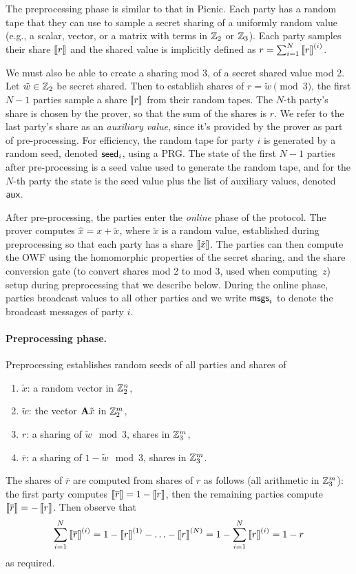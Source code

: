 The preprocessing phase is similar to that in Picnic.  Each party has a random
tape that they can use to sample a secret sharing of a uniformly random value
(e.g.,  a scalar, vector, or a matrix with terms in $\mathbb{Z}_2$ or $\mathbb{Z}_3$).  Each
party samples their share $\left\llbracket r \right\rrbracket$ and the shared value is implicitly defined as
$r = \sum_{i=1}^N \left\llbracket r \right\rrbracket^{(i)}$.  

We must also be able to create a sharing mod 3, of a secret shared value mod 2.
Let $\tilde{w}\in\mathbb{Z}_2$ be secret shared.  Then to establish shares of $r = \tilde{w} \pmod
3$, the first $N-1$ parties sample a share $\left\llbracket r \right\rrbracket$ from their random tapes. The
$N$-th party's share is chosen by the prover, so that the sum of the shares is
$r$.  We refer to the last party's share as an \emph{auxiliary value}, since
it's provided by the prover as part of pre-processing.  For efficiency, the random
tape for  party $i$ is
generated by a random seed, denoted $\textsf{seed}_i$, using a PRG. The state of the first
$N-1$ parties after pre-processing is a seed value used to generate the random
tape, and for the $N$-th party the state is the seed value plus the list of
auxiliary values, denoted $\textsf{aux}$. 

After pre-processing, the parties enter the \emph{online} phase of the protocol. 
The prover computes $\hat{x}= x + \tilde{x}$, where $\tilde{x}$ is a random value, established during
preprocessing so that each party has a share $\left\llbracket \tilde{x} \right\rrbracket$. 
The parties can then compute the OWF using the homomorphic properties of the secret sharing, 
and the share conversion gate (to convert shares mod 2 to mod 3, used when computing~$z$)
setup during preprocessing that we describe below. 
During the online phase, parties broadcast values to all other parties and we write $\textsf{msgs}_i$
to denote the broadcast messages of party $i$. 


\paragraph{Preprocessing phase.} Preprocessing establishes random seeds of all parties and shares of 
\begin{enumerate}
\item $\tilde{x}$: a random vector in $\mathbb{Z}_2^{n}$,
\item $\tilde{w}$: the vector $\mathbf{A} \tilde{x}$ in $\mathbb{Z}_2^{m}$, 
\item $r$: a sharing of $\tilde{w} \mod 3$, shares in $\mathbb{Z}_3^m$,  
\item $\overline{r}$: a sharing of $1-\tilde{w} \mod 3$, shares in $\mathbb{Z}_3^m$. 
\end{enumerate}
The shares of $\overline{r}$ are computed from shares of $r$ as follows (all arithmetic in $\mathbb{Z}_3^m$): the first
party computes $\left\llbracket \overline{r} \right\rrbracket = 1 - \left\llbracket r \right\rrbracket$, then the remaining parties compute
$\left\llbracket \overline{r} \right\rrbracket = - \left\llbracket r \right\rrbracket$.  Then observe that 
\[\sum_{i=1}^N \left\llbracket \overline{r} \right\rrbracket^{(i)} = 1 - \left\llbracket r \right\rrbracket^{(1)} - \ldots - \left\llbracket r \right\rrbracket^{(N)} = 1 - \sum_{i=1}^{N} \left\llbracket r \right\rrbracket^{(i)} = 1-r \]
 as required. 

